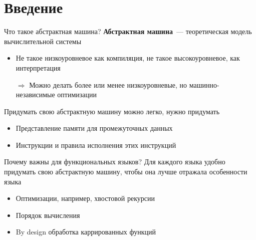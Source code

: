 \documentclass[aspectratio=1610]{beamer}
\begin{document}
\maketitle

\section{Введение}

\begin{frame}{Что такое абстрактная машина?}
  \textbf{Абстрактная машина}~--- теоретическая модель вычислительной системы

  \begin{itemize}
    \item Не такое низкоуровневое как компиляция, не такое высокоуровневое, как интерпретация
    \item[$\Rightarrow$] Можно делать более или менее низкоуровневые, но машинно-независимые оптимизации
  \end{itemize}
  Придумать свою абстрактную машину можно легко, нужно придумать
  \begin{itemize}
    \item Представление памяти для промежуточных данных
    \item Инструкции и правила исполнения этих инструкций
  \end{itemize}
\end{frame}

\begin{frame}{Почему важны для функциональных языков?}
  Для каждого языка удобно придумать свою абстрактную машину, чтобы она лучше отражала особенности языка
  \begin{itemize}
    \item Оптимизации, например, хвостовой рекурсии
    \item Порядок вычисления
    \item By design обработка каррированных функций
  \end{itemize}
\end{frame}
\end{document}

